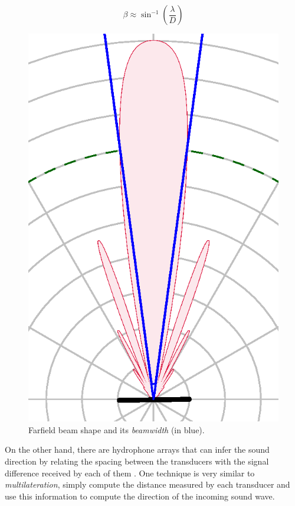 \[ \beta \approx \sin^{-1}\left(\frac{\lambda}{D} \right) \]

\begin{figure}[h]
	\centering
	\includegraphics[scale=0.6,trim={0.46 0.072 0.46
	1.03},clip]{Chap2/fig/directivity.eps}
	\caption{Farfield beam shape and its \textit{beamwidth} (in blue).}
	\label{fig:beamwidth}
\end{figure}

On the other hand, there are hydrophone arrays that can infer the sound
direction by relating the spacing between the transducers with the signal
difference received by each of them \cite{bearing,beamforming}. One technique is
very similar to \textit{multilateration}, simply compute the distance measured
by each transducer and use this information to compute the direction of the
incoming sound wave.

